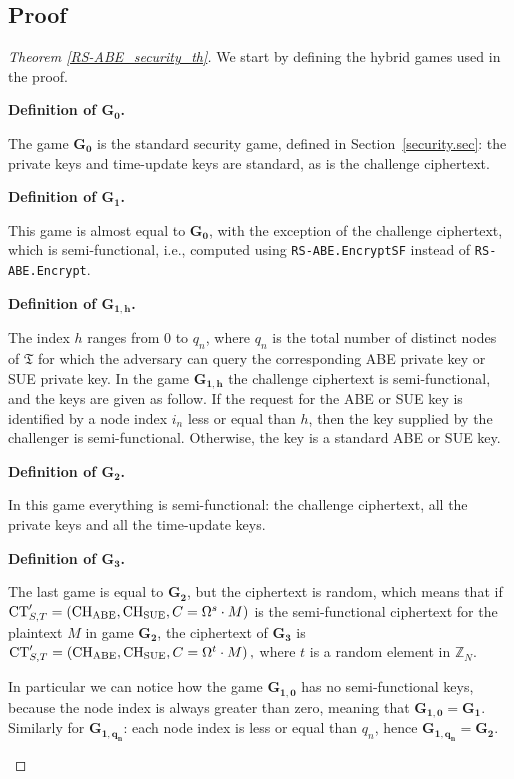 \documentclass[a4paper,10pt]{article}
\newcommand{\Z}{\mathbb{Z}}
\newcommand{\tree}{\mathfrak{T}}
\newcommand{\algorithm}[2]{\texttt{#1.#2}}
\newcommand{\game}[2]{$\mathbf{#1_{#2}}$}
\newcommand{\mathgame}[2]{\mathbf{#1_{#2}}}
\newcommand{\gamedef}[3]{
\textbf{Definition of \game{#1}{#2}.}
#3}
\begin{document}
	\subsection{Proof}
	\begin{proof}[Theorem \ref{RS-ABE_security_th}]
		We start by defining the hybrid games used in the proof. 

		\gamedef{G}{0}{
		The game \game{G}{0} is the standard security game, defined in Section~\ref{security.sec}: the private keys and time-update keys are standard, as is the challenge ciphertext.
		}
		
		\gamedef{G}{1}{
		This game is almost equal to \game{G}{0}, with the exception of the challenge ciphertext, which is semi-functional, i.e., computed using \algorithm{RS-ABE}{EncryptSF} instead of \algorithm{RS-ABE}{Encrypt}.
		}
		
 		\gamedef{G}{1,h}{
 		The index $h$ ranges from $0$ to $q_n$, where $q_n$ is the total number of distinct nodes of $\tree$ for which the adversary can query the corresponding ABE private key or SUE private key.
 		In the game \game{G}{1,h} the challenge ciphertext is semi-functional, and the keys are given as follow.
If the request for the ABE or SUE key is identified by a node index $i_n$ less or equal than $h$, then the key supplied by the challenger is semi-functional.
Otherwise, the key is a standard ABE or SUE key.
}
		
		\gamedef{G}{2}{
		In this game everything is semi-functional: the challenge ciphertext, all the private keys and all the time-update keys.
		}
		
		\gamedef{G}{3}{
		The last game is equal to \game{G}{2}, but the ciphertext is random, which means that if 
		$\mathrm{CT}^\prime_{S,T}=( \mathrm{CH}_{\textnormal{ABE}},\mathrm{CH}_{\textnormal{SUE}},C=\Omega^s \cdot M ) $ is the semi-functional ciphertext for the plaintext $M$ in game \game{G}{2}, the ciphertext of \game{G}{3} is 
		$
		\mathrm{CT}^\prime_{S,T}=\left(\mathrm{CH}_{\textnormal{ABE}},\mathrm{CH}_{\textnormal{SUE}},C=\Omega^t \cdot M\right),
		$
		where $t$ is a random element in $\Z_N$.
		}
		
		In particular we can notice how the game \game{G}{1,0} has no semi-functional keys, because the node index is always greater than zero, meaning that $\mathgame{G}{1,0}=\mathgame{G}{1}$. Similarly for \game{G}{1,q_n}: each node index is less or equal than $q_n$, hence $\mathgame{G}{1,q_n}=\mathgame{G}{2}$.
	
	\vspace{-1em} \begin{table}[H]
		\begin{center}
		\makebox[\textwidth][c]{ \renewcommand{\arraystretch}{1.2}


}
\end{center}
\end{table}
\end{proof}
\end{document}
